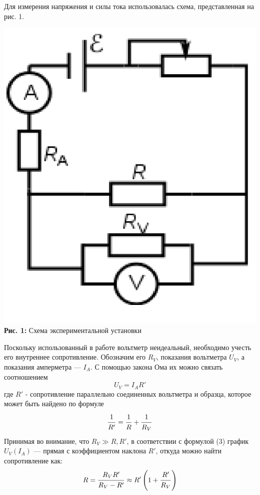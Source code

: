 \documentclass[12pt,a4paper]{scrartcl}
\begin{document}
	Для измерения напряжения и силы тока использовалась схема, представленная на рис. 1. 
	\begin{center}
		\includegraphics*[scale=0.2]{PIC_1.png}
		\\\textbf{Рис. 1:} Схема экспериментальной установки
	\end{center}

	Поскольку использованный в работе вольтметр неидеальный, необходимо учесть его внутреннее сопротивление. Обозначим его $R_V$, показания вольтметра $U_V$, а показания амперметра --- $I_A$. С помощью закона Ома их можно связать соотношением
	\begin{equation}
		U_V = I_A R'
	\end{equation}
	где $R'$ - сопротивление параллельно соединенных вольтметра и образца, которое может быть найдено по формуле
	\begin{equation}
		\dfrac{\strut 1}{\strut R'} = \dfrac{\strut 1}{\strut R} + \dfrac{\strut 1}{\strut R_V}
	\end{equation}
	Принимая во внимание, что $R_V \gg R,  R'$, в соответствии с формулой (3) график $U_V(I_A)$ --- прямая с коэффициентом наклона $R'$, откуда можно найти сопротивление как:
	\begin{equation}
		R = \dfrac{\strut R_V R'}{\strut R_V - R'} \approx R'\left(1 + \dfrac{\strut R'}{\strut R_V}\right)
	\end{equation}
\end{document}
